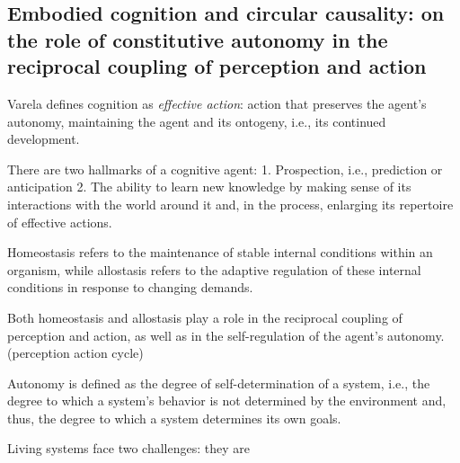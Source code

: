 


\subsection{Embodied cognition and circular causality: on the role of constitutive autonomy in the reciprocal coupling of perception and action}

\cite{vernon_embodied_2015}
Varela defines cognition as \textit{effective action}: action that preserves the agent's autonomy, maintaining the agent and its ontogeny, i.e., its continued development.

There are two hallmarks of a cognitive agent:
1. Prospection, i.e., prediction or anticipation
2. The ability to learn new knowledge by making sense of its interactions with the world around it and, in the process, enlarging its repertoire of effective actions.

Homeostasis refers to the maintenance of stable internal conditions within an organism, while allostasis refers to the adaptive regulation of these internal conditions in response to changing demands.

Both homeostasis and allostasis play a role in the reciprocal coupling of perception and action, as well as in the self-regulation of the agent's autonomy. (\gls{perception action cycle})

Autonomy is defined as the degree of self-determination of a system, i.e., the degree to which a system’s behavior is not determined by the environment and, thus, the degree to which a system determines its own goals. 


Living systems face two challenges: they are 

